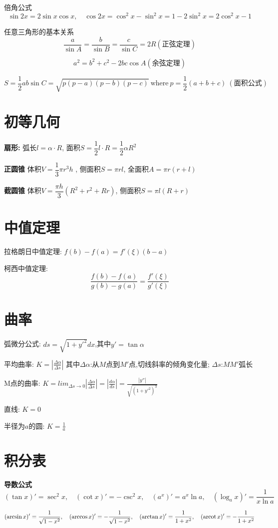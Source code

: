 \documentclass{book}
\begin{document}
倍角公式
$$ \sin 2x=2\sin x \cos x,\quad \cos 2x=\cos^2 x-\sin ^2 x=1-2\sin^2 x=2\cos^2 x -1 $$

任意三角形的基本关系
$$
\frac{a}{\sin A}=
\frac{b}{\sin B}=
\frac{c}{\sin C}=
2R(\mbox{正弦定理})
$$

$$ a^2=b^2+c^2-2bc\cos A (\mbox{余弦定理}) $$

$$ S= \frac{ 1}{2}ab\sin C=\sqrt{p(p-a)(p-b)(p-c)}~\mbox{where}~p=\frac{1}{2}(a+b+c)~ (\mbox{面积公式}) $$

\section{初等几何}
\textbf{扇形:}
弧长$l=\alpha \cdot R$, \quad
面积$S=\dfrac{1}{2}l\cdot R=\dfrac{1}{2}\alpha R^2$

\textbf{正圆锥}
体积$V=\dfrac{1}{3}\pi r^3 h$ , \quad
侧面积$S=\pi rl$, \quad
全面积$A=\pi r(r+l)$

\textbf{截圆锥}
体积$V=\dfrac{\pi h}{3}(R^2+r^2+Rr)$, \quad
侧面积$S=\pi l(R+r)$

\section{中值定理}
拉格朗日中值定理: $f(b)-f(a)=f'(\xi)(b-a)$

柯西中值定理: $$\frac{f(b)-f(a)}{g(b)-g(a)}=\frac{f'(\xi) }{g'(\xi)}$$

\section{曲率}
弧微分公式: $ds=\sqrt{1+y'^2}dx$,其中$y'=\tan \alpha$

平均曲率: $K=|\frac{\Delta\alpha}{\Delta s}|$ 其中$\Delta \alpha$:从$M$点到$M'$点,切线斜率的倾角变化量; $\Delta s$:$MM'$弧长

M点的曲率: $K=lim_{\Delta s \to 0}|\frac{\Delta\alpha}{\Delta s}|=|\frac{d \alpha}{ds}|=\frac{|y''|}{\sqrt{(1+y'^2)^3}}$

直线: $K=0$

半径为$a$的圆: $K=\frac{1}{a}$

\section{积分表}
\textbf{导数公式}
$$
(\tan x)'=\sec ^2 x,\quad
(\cot x)'=-\csc^2 x,\quad
(a^x)'=a^x\ln a,\quad
(\log_a x)'=\frac{1}{x \ln a}
$$

$$
(\arcsin x)'=\frac{1}{\sqrt{1-x^2}}, \quad
(\arccos x)'=-\frac{1}{\sqrt{1-x^2}}, \quad
(\arctan x)'=\frac{1}{1+x^2}, \quad
(\operatorname{arcot} x)'=-\frac{1}{1+x^2}
$$
\end{document}
